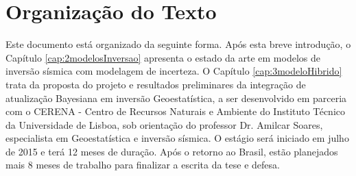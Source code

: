 \section{Organização do Texto}

Este documento está organizado da seguinte forma. Após esta breve introdução, o
Capítulo \ref{cap:2modelosInversao} apresenta o estado da arte em modelos de
inversão sísmica com modelagem de incerteza. O Capítulo \ref{cap:3modeloHibrido}
trata da proposta do projeto e resultados preliminares da integração de
atualização Bayesiana em inversão Geoestatística, a ser desenvolvido em parceria
com o CERENA - Centro de Recursos Naturais e Ambiente do Instituto Técnico da
Universidade de Lisboa, sob orientação do professor Dr. Amilcar Soares,
especialista em Geoestatística e inversão sísmica. O estágio será iniciado em
julho de 2015 e terá 12 meses de duração. Após o retorno ao Brasil, estão
planejados mais 8 meses de trabalho para finalizar a escrita da tese e defesa.

